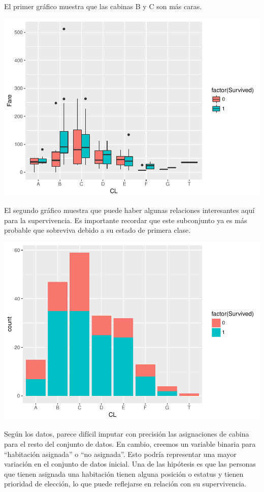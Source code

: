 \documentclass[]{article}
\begin{document}
El primer gráfico muestra que las cabinas B y C son más caras.

\includegraphics{titanicDataClean_files/figure-latex/cabinsplit-1.pdf}

El segundo gráfico muestra que puede haber algunas relaciones
interesantes aquí para la supervivencia. Es importante recordar que este
subconjunto ya es más probable que sobreviva debido a su estado de
primera clase.

\includegraphics{titanicDataClean_files/figure-latex/cabinsplit2-1.pdf}

Según los datos, parece difícil imputar con precisión las asignaciones
de cabina para el resto del conjunto de datos. En cambio, creemos un
variable binaria para ``habitación asignada'' o ``no asignada''. Esto
podría representar una mayor variación en el conjunto de datos inicial.
Una de las hipótesis es que las personas que tienen asignada una
habitación tienen alguna posición o estatus y tienen prioridad de
elección, lo que puede reflejarse en relación con su supervivencia.
\end{document}
